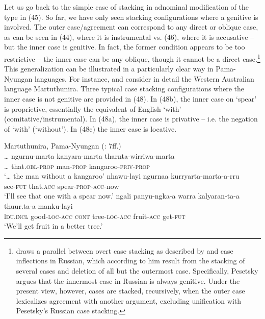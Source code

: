 \documentclass[output=paper]{langsci/langscibook}
\begin{document}
Let us go back to the simple case of stacking in adnominal modification of the type in (45). So far, we have only seen stacking configurations where a genitive is involved. The outer case\slash agreement can correspond to any direct or oblique case, as can be seen in (44), where it is instrumental vs. (46), where it is accusative – but the inner case is genitive. In fact, the former condition appears to be too restrictive – the inner case can be any oblique, though it cannot be a direct case.\footnote{\citet{Pesetsky2013} draws a parallel between overt case stacking as described by \citet{Richards2013} and case inflections in Russian, which according to him result from the stacking of several cases and deletion of all but the outermost case. Specifically, Pesetsky argues that the innermost case in Russian is always genitive. Under the present view, however, cases are stacked, recursively, when the outer case lexicalizes agreement with another argument, excluding unification with Pesetsky’s Russian case stacking.}  This generalization can be illustrated in a particularly clear way in Pama-Nyungan languages. For instance, \citet{Dench1988} and \citet{Dench1995} consider in detail the Western Australian language Martuthunira. Three typical case stacking configurations where the inner case is not genitive are provided in (48). In (48b), the inner case on ‘spear’ is proprietive, essentially the equivalent of English ‘with’ (comitative\slash instrumental). In (48a), the inner case is privative – i.e. the negation of ‘with’ (‘without’). In (48c) the inner case is locative. 

\ea%
    Martuthunira, Pama-Nyungan (\citealt{Dench1988}: 7ff.)\label{ex:manzini:48}\\
    \ea
    \gll … ngurnu-marta   kanyara-marta  tharnta-wirriwa-marta    \\
         … that.\textsc{obl-prop}   man-\textsc{prop}   kangaroo-\textsc{priv-prop}\\
    \glt ‘… the man without a kangaroo’
    \ex  
    \gll  nhawu-layi   ngurnaa  kurryarta-marta-a-rru    \\
         see-\textsc{fut}   that.\textsc{acc}   spear-\textsc{prop-acc}{}-now\\
    \glt ‘I'll see that one with a spear now.’
    \ex  
    \gll ngali   panyu-ngka-a   warra  kalyaran-ta-a   thuur.ta-a   manku-layi\\
         l\textsc{du.incl}   good-\textsc{loc-acc}  \textsc{cont}   tree-\textsc{loc-acc}   fruit-\textsc{acc}   get-\textsc{fut}\\
    \glt ‘We'll get fruit in a better tree.’ 
    \z
\z 
\end{document}

